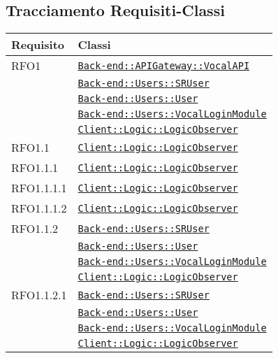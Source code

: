 \subsection{Tracciamento Requisiti-Classi}
\normalsize
\begin{longtable}{|>{\centering}m{3cm}|m{10cm}<{\centering}|}
\hline 
\textbf{Requisito} & \textbf{Classi}\\
\hline
\endhead
RFO1 & \hyperref[Back-end::APIGateway::VocalAPI]{\texttt{Back-end::APIGateway::VocalAPI}}\\
& \hyperref[Back-end::Users::SRUser]{\texttt{Back-end::Users::SRUser}}\\
& \hyperref[Back-end::Users::User]{\texttt{Back-end::Users::User}}\\
& \hyperref[Back-end::Users::VocalLoginModule]{\texttt{Back-end::Users::VocalLoginModule}}\\
& \hyperref[Client::Logic::LogicObserver]{\texttt{Client::Logic::LogicObserver}}\\ \hline

RFO1.1 & \hyperref[Client::Logic::LogicObserver]{\texttt{Client::Logic::LogicObserver}}\\ \hline

RFO1.1.1 & \hyperref[Client::Logic::LogicObserver]{\texttt{Client::Logic::LogicObserver}}\\ \hline

RFO1.1.1.1 & \hyperref[Client::Logic::LogicObserver]{\texttt{Client::Logic::LogicObserver}}\\ \hline

RFO1.1.1.2 & \hyperref[Client::Logic::LogicObserver]{\texttt{Client::Logic::LogicObserver}}\\ \hline

RFO1.1.2 & \hyperref[Back-end::Users::SRUser]{\texttt{Back-end::Users::SRUser}}\\
& \hyperref[Back-end::Users::User]{\texttt{Back-end::Users::User}}\\
& \hyperref[Back-end::Users::VocalLoginModule]{\texttt{Back-end::Users::VocalLoginModule}}\\
& \hyperref[Client::Logic::LogicObserver]{\texttt{Client::Logic::LogicObserver}}\\ \hline

RFO1.1.2.1 & \hyperref[Back-end::Users::SRUser]{\texttt{Back-end::Users::SRUser}}\\
& \hyperref[Back-end::Users::User]{\texttt{Back-end::Users::User}}\\
& \hyperref[Back-end::Users::VocalLoginModule]{\texttt{Back-end::Users::VocalLoginModule}}\\
& \hyperref[Client::Logic::LogicObserver]{\texttt{Client::Logic::LogicObserver}}\\ \hline


\end{longtable}
